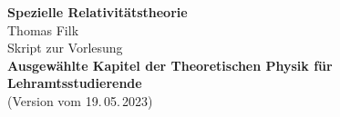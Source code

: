 \documentclass[german,10pt]{book}
\begin{document}
\begin{center}
{\bf\Large Spezielle Relativit\"atstheorie}\\[0.3cm] 
{\large Thomas Filk}\\[1cm]
Skript zur Vorlesung\\[1cm]
{\bf\large Ausgew\"ahlte Kapitel der Theoretischen Physik f\"ur
Lehramtsstudierende}\\[1cm]
(Version vom 19.\,05.\,2023)
\end{center}
\thispagestyle{empty}

\tableofcontents






\setcounter{chapter}{0}
\renewcommand{\thechapter}{A\arabic{chapter}}
\renewcommand{\thesection}{\thechapter.\arabic{section}}
\newpage
%
%


\printindex
\end{document}
